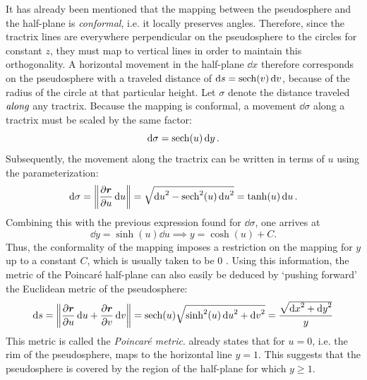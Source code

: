 It has already been mentioned that the mapping between the pseudosphere and the half-plane is \emph{conformal}, i.e. it locally preserves angles. Therefore, since the tractrix lines are everywhere perpendicular on the pseudosphere to the circles for constant \(z\), they must map to vertical lines in order to maintain this orthogonality. A horizontal movement in the half-plane \(\dd{x}\) therefore corresponds on the pseudosphere with a traveled distance of \( \dd{s} = \sech(v)\dd{v}\), because of the radius of the circle at that particular height. Let $\sigma$ denote the distance traveled $\emph{along}$ any tractrix. Because the mapping is conformal, a movement \(\dd{\sigma}\) along a tractrix must be scaled by the same factor:
\[ \dd{\sigma} = \sech(u)\dd{y}. \]
Subsequently, the movement along the tractrix can be written in terms of \(u\) using the parameterization:
\[ \dd{\sigma} = \norm{\pdv{\vec{r}}{u}\dd{u}} = \sqrt{\dd{u}^2 - \sech[2](u)\dd{u}^2} = \tanh(u)\dd{u}. \]
Combining this with the previous expression found for \(\dd{\sigma}\), one arrives at
\begin{equation}
    \dd{y} = \sinh(u)\dd{u} \implies y = \cosh(u) + C.
    \label{eq:dy_halfplane}
\end{equation}
Thus, the conformality of the mapping imposes a restriction on the mapping for \(y\) up to a constant \(C\), which is usually taken to be 0 \cite{Needham1997}. Using this information, the metric of the Poincaré half-plane can also easily be deduced by `pushing forward'
 the Euclidean metric of the pseudosphere:
\begin{equation} 
    \dd{s} = \norm{\pdv{\vec{r}}{u}\dd{u} + \pdv{\vec{r}}{v}\dd{v}}
    = \sech(u)\sqrt{\sinh[2](u)\dd{u}^2 + \dd{v}^2} = \frac{\sqrt{\dd{x}^2 + \dd{y}^2}}{y}
    \label{eq:hp_metric}
\end{equation}
This metric is called the \emph{Poincaré metric}.  already states that for \(u = 0\), i.e. the rim of the pseudosphere, maps to the horizontal line \(y = 1\). This suggests that the pseudosphere is covered by the region of the half-plane for which \(y \geq 1\).

